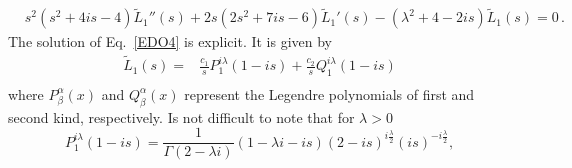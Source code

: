 \documentclass[%
 aip,
 jmp,%
 amsmath,amssymb,
 reprint,%
]{revtex4-2}
\begin{document}
\begin{equation}\label{EDO4}
\begin{aligned}
& s^2 \left(s^2+4is -4\right) \widetilde L_1''(s) + 2s \left(2s^2+7is-6\right) \widetilde L_1'(s) - \left(\lambda^2+4 -2is\right)\widetilde L_1(s)=0\,.
\end{aligned}
\end{equation}
The solution of Eq.~\eqref{EDO4} is explicit. It is given by
\begin{equation}\label{eq:L1}
    \begin{aligned}
        	\widetilde L_1(s)=& \frac{c_1}{s}P_1^{i \lambda }(1-i s) + \frac{c_2}{s} Q_1^{i \lambda }(1-i s)\\
    \end{aligned}
\end{equation}
where $P^\alpha_\beta(x)$ and $Q^\alpha_\beta(x)$ represent the Legendre polynomials of first and second kind, respectively.
Is not difficult to note that for $\lambda >0$
\begin{equation}\label{eq: P_1ilambda}
    P_1^{i\lambda}(1-is)=\frac{1}{ \Gamma (2-\lambda i)} (1-\lambda i-i s) (2-i s)^{i\frac{\lambda}{2} } (i s)^{-i\frac{\lambda}{2}},%
\end{equation}
\end{document}
